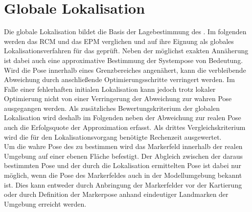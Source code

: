 \section{Globale Lokalisation}
Die globale Lokalisation bildet die Basis der Lagebestimmung des . Im folgenden werden das RCM und das EPM verglichen und auf ihre Eignung als globales Lokalisationsverfahren für das \kps{} geprüft. Neben der möglichst exakten Annäherung ist dabei auch eine approximative Bestimmung der Systempose von Bedeutung. Wird die Pose innerhalb eines Grenzbereiches angenähert, kann die verbleibende Abweichung durch anschließende Optimierungsschritte verringert werden. Im Falle einer fehlerhaften initialen Lokalisation kann jedoch trotz lokaler Optimierung nicht von einer Verringerung der Abweichung zur wahren Pose ausgegangen werden. Als zusätzliches Bewertungskriterium der globalen Lokalisation wird deshalb im Folgenden neben der Abweichung zur realen Pose auch die Erfolgsquote der Approximation erfasst. Als drittes Vergleichskriterium wird die für den Lokalisationsvorgang benötigte Rechenzeit ausgewertet.\\


Um die wahre Pose des  zu bestimmen wird das Markerfeld innerhalb der realen Umgebung auf einer ebenen Fläche befestigt. Der Abgleich zwischen der daraus bestimmten Pose und der durch die Lokalisation ermittelten Pose ist dabei nur möglich, wenn die Pose des Markerfeldes auch in der Modellumgebung bekannt ist. Dies kann entweder durch Anbringung der Markerfelder vor der Kartierung oder durch Definition der Markerpose anhand eindeutiger Landmarken der Umgebung erreicht werden.\\

